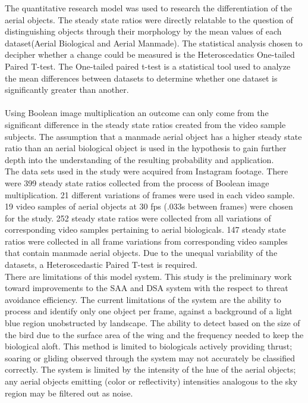 \indent The quantitative research model was used to research the differentiation of the aerial objects. The steady state ratios were directly relatable to the question of distinguishing objects through their morphology by the mean values of each dataset(Aerial Biological and Aerial Manmade). The statistical analysis chosen to decipher whether a change could be measured is the Heteroscedatics One-tailed Paired T-test. The One-tailed paired t-test is a statistical tool used to analyze the mean differences between datasets to determine whether one dataset is significantly greater than another. \\ \\
\indent Using Boolean image multiplication an outcome can only come from the significant difference in the steady state ratios created from the video sample subjects. The assumption that a manmade aerial object has a higher steady state ratio than an aerial biological object is used in the hypothesis to gain further depth into the understanding of the resulting probability and application.\\
\indent The data sets used in the study were acquired from Instagram footage. There were 399 steady state ratios collected from the process of Boolean image multiplication. 21 different variations of frames were used in each video sample. 19 video samples of aerial objects at 30 fps (.033s between frames) were chosen for the study. 252 steady state ratios were collected from all variations of corresponding video samples pertaining to aerial biologicals. 147 steady state ratios were collected in all frame variations from corresponding video samples that contain manmade aerial objects. Due to the unequal variability of the datasets, a Heteroscedastic Paired T-test is required.\\     
\indent There are limitations of this model system. This study is the preliminary work toward improvements to the SAA and DSA system with the respect to threat avoidance efficiency. The current limitations of the system are the ability to process and identify only one object per frame, against a background of a light blue region unobstructed by landscape. The ability to detect based on the size of the bird due to the surface area of the wing and the frequency needed to keep the biological aloft. This method is limited to biologicals actively providing thrust; soaring or gliding observed through the system may not accurately be classified correctly. The system is limited by the intensity of the hue of the aerial objects; any aerial objects emitting (color or reflectivity) intensities analogous to the sky region may be filtered out as noise.\\ 
